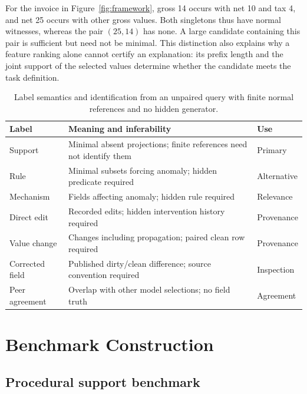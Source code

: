 \documentclass[conference]{IEEEtran}
\begin{document}
For the invoice in Figure~\ref{fig:framework}, gross 14 occurs with net 10 and tax 4, and net 25 occurs with other gross values. Both singletons thus have normal witnesses, whereas the pair $(25,14)$ has none. A large candidate containing this pair is sufficient but need not be minimal. This distinction also explains why a feature ranking alone cannot certify an explanation: its prefix length and the joint support of the selected values determine whether the candidate meets the task definition.

\begin{table}[t]
\centering\footnotesize
\caption{Label semantics and identification from an unpaired query with finite normal references and no hidden generator.}
\setlength{\tabcolsep}{3pt}
\renewcommand{\arraystretch}{1.12}
\begin{tabularx}{\columnwidth}{|l|>{\raggedright\arraybackslash}X|>{\raggedright\arraybackslash}p{1.65cm}|}
\hline
Label & Meaning and inferability & Use \\
\hline
Support & Minimal absent projections; finite references need not identify them & Primary \\
Rule & Minimal subsets forcing anomaly; hidden predicate required & Alternative \\
Mechanism & Fields affecting anomaly; hidden rule required & Relevance \\
Direct edit & Recorded edits; hidden intervention history required & Provenance \\
Value change & Changes including propagation; paired clean row required & Provenance \\
Corrected field & Published dirty/clean difference; source convention required & Inspection \\
Peer agreement & Overlap with other model selections; no field truth & Agreement \\
\hline
\end{tabularx}
\renewcommand{\arraystretch}{1.0}
\label{tab:semantics}
\end{table}



\section{Benchmark Construction}
\subsection{Procedural support benchmark}
\end{document}

